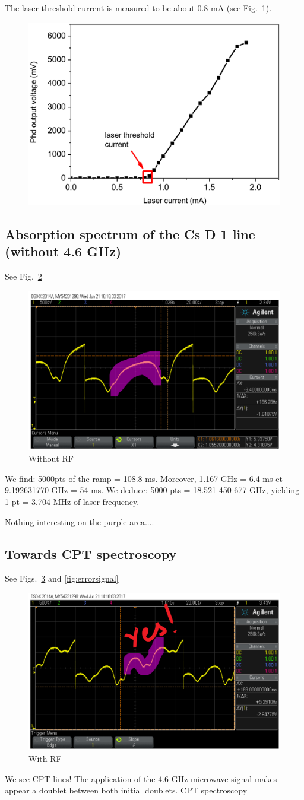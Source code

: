 \documentclass[a4paper,11pt]{article}
\begin{document}
The laser threshold current is measured to be about 0.8 mA (see Fig.~\ref{fig:threshold}).
\begin{figure}[h!]
	\centering
	\includegraphics[width=0.5\linewidth]{threshold}
	\caption{}
	\label{fig:threshold}
\end{figure}

\subsection{Absorption spectrum of the Cs D 1 line (without 4.6 GHz)}
See Fig.~\ref{fig:absorption1}
\begin{figure}[h!]
	\centering
	\includegraphics[width=0.5\linewidth]{absorption1}
	\caption{Without RF}
	\label{fig:absorption1}
\end{figure}
We find: 5000pts of the ramp = 108.8 ms.
Moreover, 1.167 GHz = 6.4 ms et 9.192631770 GHz = 54 ms.
We deduce: 5000 pts = 18.521 450 677 GHz, yielding 1 pt = 3.704 MHz of laser frequency.

Nothing interesting on the purple area....


\subsection{Towards CPT spectroscopy}
See Figs.~\ref{fig:absorption2} and \ref{fig:errorsignal}
\begin{figure}[h!]
	\centering
	\includegraphics[width=0.5\linewidth]{absorption2}
	\caption{With RF}
	\label{fig:absorption2}
\end{figure}
We see CPT lines!
The application of the 4.6 GHz microwave signal makes appear a doublet between both initial doublets. CPT
spectroscopy
\end{document}
